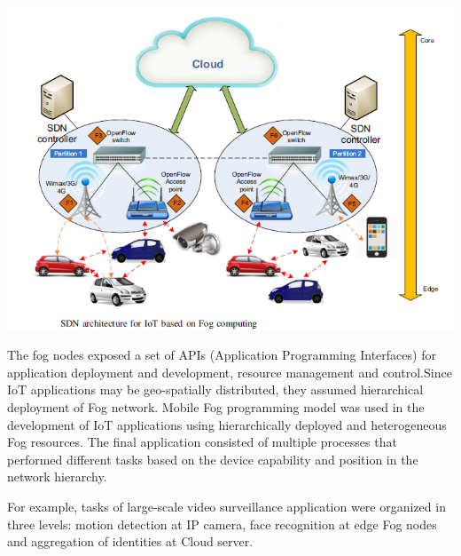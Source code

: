 \documentclass{article}
\begin{document}
\includegraphics[scale=0.7]{sdn.png}

The fog nodes exposed a set of APIs (Application Programming Interfaces) for application deployment and development, resource management and control.Since IoT applications may be geo-spatially distributed, they assumed hierarchical deployment of Fog network. 
Mobile Fog programming model\cite{hong2013mobile} was used in the development of IoT applications using hierarchically deployed and heterogeneous Fog resources.
The final application consisted of multiple processes that performed different tasks based on the device capability and position in the network hierarchy.

For example, tasks of large-scale video surveillance application were organized in three levels: motion detection at IP camera, face recognition at edge Fog nodes and aggregation of identities at Cloud server\cite{tomovic2017software}.
\end{document}

